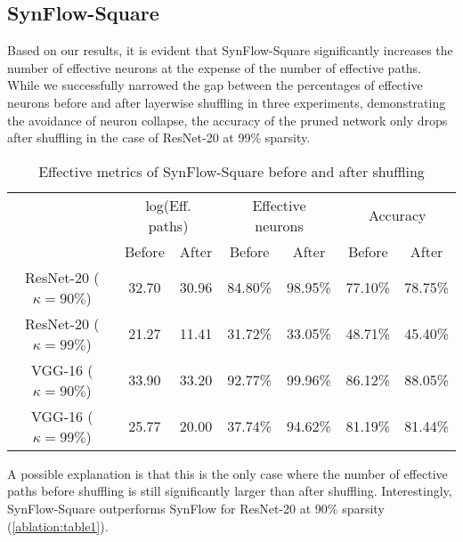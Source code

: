 \subsection{SynFlow-Square}
Based on our results, it is evident that SynFlow-Square significantly increases the number of effective neurons at the expense of the number of effective paths. While we successfully narrowed the gap between the percentages of effective neurons before and after layerwise shuffling in three experiments, demonstrating the avoidance of neuron collapse, the accuracy of the pruned network only drops after shuffling in the case of ResNet-20 at 99\% sparsity. 
\begin{table}[h!]
\centering
\begin{tabular}{|c|cc|cc|cc|}
\hline
\multirow{2}{*}{} & \multicolumn{2}{c|}{log(Eff. paths)} & \multicolumn{2}{c|}{Effective neurons} & \multicolumn{2}{c|}{Accuracy} \\ \cline{2-7} 
                  & Before            & After            & Before             & After             & Before        & After         \\ \hline
ResNet-20 ($\kappa=90\%$)        & 32.70             & 30.96            & 84.80\%     & 98.95\%    & 77.10\%       & 78.75\%       \\ \hline
ResNet-20 ($\kappa=99\%$)        & 21.27             & 11.41            & 31.72\%     & 33.05\%    & 48.71\%       & 45.40\%       \\ \hline
VGG-16 ($\kappa=90\%$)           & 33.90             & 33.20            & 92.77\%     & 99.96\%    & 86.12\%       & 88.05\%       \\ \hline
VGG-16 ($\kappa=99\%$)           & 25.77             & 20.00            & 37.74\%     & 94.62\%    & 81.19\%       & 81.44\%       \\ \hline
\end{tabular}
\caption{Effective metrics of SynFlow-Square before and after shuffling}
\label{table:sf-square}
\end{table}

A possible explanation is that this is the only case where the number of effective paths before shuffling is still significantly larger than after shuffling. Interestingly, SynFlow-Square outperforms SynFlow for ResNet-20 at 90\% sparsity (\autoref{ablation:table1}).

